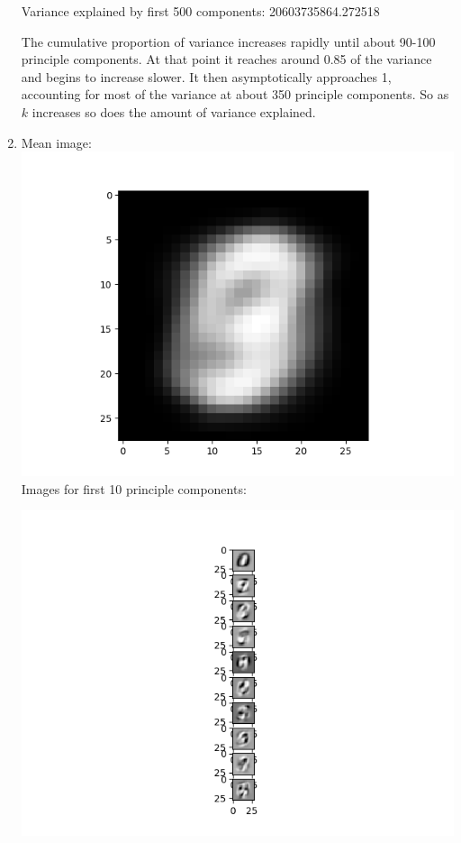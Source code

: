 \documentclass[submit]{harvardml}
\begin{document}
\begin{enumerate}
    Variance explained by first 500 components: 20603735864.272518

    The cumulative proportion of variance increases rapidly until about 90-100 principle components. At that point it reaches around 0.85 of the variance and begins to increase slower. It then asymptotically approaches 1, accounting for most of the variance at about 350 principle components. So as $k$ increases so does the amount of variance explained. 
    
    \item
    Mean image:\newline
    \includegraphics[scale=0.35]{hw5/Pics/2_2.png}
    \newline
    Images for first 10 principle components:\newline        \centerline{\includegraphics[scale=1.5]{hw5/Pics/2_2_2.png}}
    \newline
    

\end{enumerate}
\end{document}
